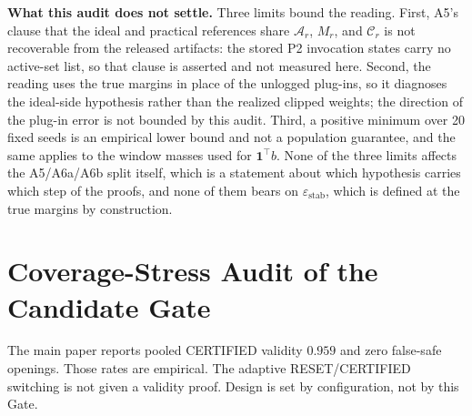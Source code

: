 \noindent\textbf{What this audit does not settle.}  Three limits bound the
reading.  First, A5's clause that the ideal and practical references share
$\mathcal{A}_r$, $M_r$, and $\mathcal{C}_r$ is not recoverable from the
released artifacts: the stored P2 invocation states carry no active-set list,
so that clause is asserted and not measured here.  Second, the reading uses
the true margins in place of the unlogged plug-ins, so it diagnoses the
ideal-side hypothesis rather than the realized clipped weights; the direction
of the plug-in error is not bounded by this audit.  Third, a positive minimum
over 20 fixed seeds is an empirical lower bound and not a population
guarantee, and the same applies to the window masses used for
$\mathbf{1}^{\top}b$.  None of the three limits affects the A5/A6a/A6b split
itself, which is a statement about which hypothesis carries which step of the
proofs, and none of them bears on $\varepsilon_{\mathrm{stab}}$, which is
defined at the true margins by construction.


\section{Coverage-Stress Audit of the Candidate Gate}
\label{app:certificate_audit}

The main paper reports pooled CERTIFIED validity $0.959$ and zero
false-safe openings.  Those rates are empirical.  The adaptive
RESET/CERTIFIED switching is not given a validity proof.
Design is set by configuration, not by this Gate.

